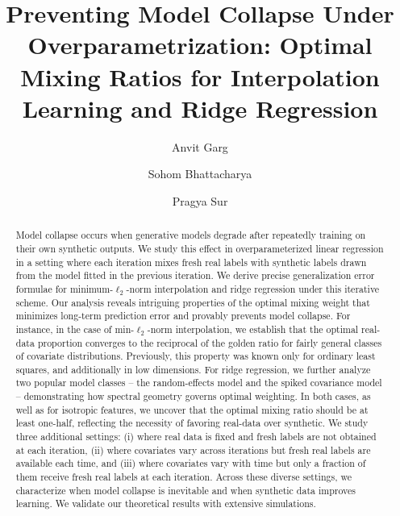 \documentclass[10pt]{article}
\title{Preventing Model Collapse Under Overparametrization: Optimal Mixing Ratios for Interpolation Learning and Ridge Regression}
\numberwithin{thm}{section}
\numberwithin{remark}{section}
\numberwithin{ex}{section}
\numberwithin{ass}{section}
\numberwithin{defn}{section}
\numberwithin{lemma}{section}
\numberwithin{corollary}{section}
\numberwithin{prop}{section}
\numberwithin{equation}{section}
\begin{document}
\author[1]{Anvit Garg}
\author[2]{Sohom Bhattacharya}
\author[1]{Pragya Sur}
\maketitle
{}

\begin{abstract}
  Model collapse occurs when generative models degrade after repeatedly training on their own synthetic outputs.
  We study this effect in overparameterized linear regression in a setting where each iteration mixes fresh real labels with synthetic labels drawn from the model fitted in the previous iteration.
  We derive precise generalization error formulae for minimum-$\ell_2$-norm interpolation and ridge regression under this iterative scheme.
  Our analysis reveals intriguing properties of the optimal mixing weight that minimizes long-term prediction error and provably prevents model collapse. For instance, in the case of min-$\ell_2$-norm interpolation, we establish that the optimal real-data proportion converges to the reciprocal of the golden ratio for fairly general classes of covariate distributions.
  Previously, this property was known only for ordinary least squares, and additionally in low dimensions.
  For ridge regression, we further analyze two popular model classes -- the random-effects model and the spiked covariance model -- demonstrating how spectral geometry governs optimal weighting.
  In both cases, as well as for isotropic features, we uncover that the optimal mixing ratio should be at least one-half, reflecting the necessity of favoring real-data over synthetic.
  We study three additional settings: (i) where real data is fixed and fresh labels are not obtained at each iteration, (ii) where covariates vary across iterations but fresh real labels are available each time, and (iii) where covariates vary with time but only a fraction of them receive fresh real labels at each iteration. Across these diverse settings, we characterize when model collapse is inevitable and when synthetic data improves learning.
  We validate our theoretical results with extensive simulations.
\end{abstract}
\end{document}
